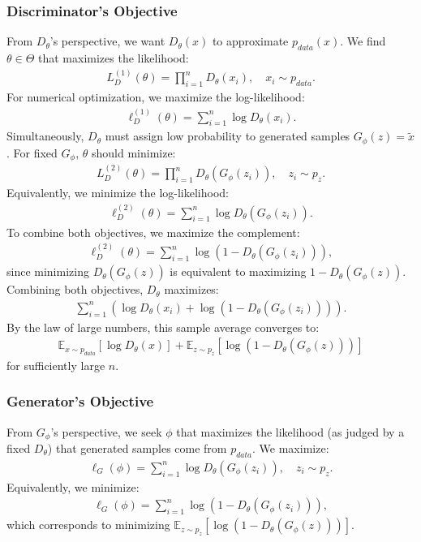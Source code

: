 \subsubsection{Discriminator's Objective}%
\label{sec:derivation-d}
From $D_\theta$'s perspective, we want $D_\theta(x)$ to approximate $p_{data}(x)$. We find $\theta \in \Theta$ that maximizes the likelihood:
\begin{align}
	\label{eq:d-1}
	L_D^{(1)}(\theta) = \prod_{i=1}^n D_\theta(x_i), \quad x_i \sim p_{data}.
\end{align}
For numerical optimization, we maximize the log-likelihood:
\begin{align}
	\label{eq:d-l1}
	\ell_D^{(1)}(\theta) = \sum_{i=1}^n \log D_\theta(x_i).
\end{align}
Simultaneously, $D_\theta$ must assign low probability to generated samples $G_\phi(z) = \tilde{x}$. For fixed $G_\phi$, $\theta$ should minimize:
\begin{align}
	L_D^{(2)}(\theta) = \prod_{i=1}^n D_\theta(G_\phi(z_i)), \quad z_i \sim p_z.
\end{align}
Equivalently, we minimize the log-likelihood:
\begin{align}
	\label{eq:d-l2} \ell_D^{(2)}(\theta) = \sum_{i=1}^n \log D_\theta(G_\phi(z_i)).
\end{align}
To combine both objectives, we maximize the complement:
\begin{align}
	\ell_D^{(2)}(\theta) = \sum_{i=1}^n \log(1 - D_\theta(G_\phi(z_i))),
\end{align}
since minimizing $D_\theta(G_\phi(z))$ is equivalent to maximizing $1 - D_\theta(G_\phi(z))$. Combining both objectives, $D_\theta$ maximizes:
\begin{align}
	\sum_{i=1}^n \left( \log D_\theta(x_i) + \log(1 - D_\theta(G_\phi(z_i))) \right).
\end{align}
By the law of large numbers, this sample average converges to:
\begin{align}
	\label{eq:objective-for-d}
	\mathbb{E}_{x \sim p_{data}}[\log D_\theta(x)] + \mathbb{E}_{z \sim p_z}[\log(1 - D_\theta(G_\phi(z)))]
\end{align}
for sufficiently large $n$.
\subsubsection{Generator's Objective}%
\label{sec:derivation-g}
From $G_\phi$'s perspective, we seek $\phi$ that maximizes the likelihood (as judged by a fixed $D_\theta$) that generated samples come from $p_{data}$. We maximize:
\begin{align}
	\ell_G(\phi) = \sum_{i=1}^n \log D_\theta(G_\phi(z_i)), \quad z_i \sim p_z.
\end{align}
Equivalently, we minimize:
\begin{align}
	\ell_G(\phi) = \sum_{i=1}^n \log(1 - D_\theta(G_\phi(z_i))),
\end{align}
which corresponds to minimizing $\mathbb{E}_{z \sim p_z}[\log(1 - D_\theta(G_\phi(z)))]$.
